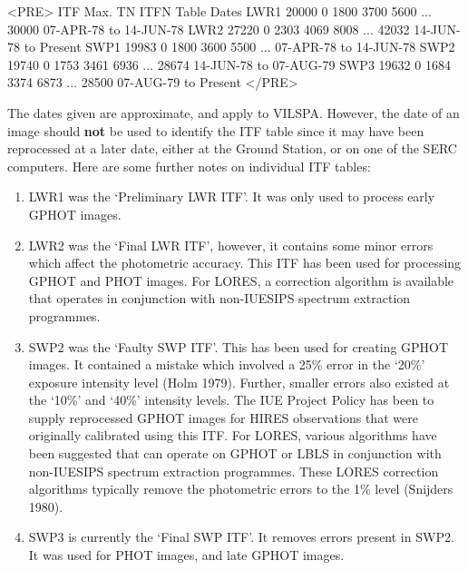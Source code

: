 \begin{htmlonly}
\begin{rawhtml}
<PRE>
ITF   Max. TN  ITFN Table                       Dates
LWR1  20000    0  1800  3700  5600  ... 30000   07-APR-78 to 14-JUN-78
LWR2  27220    0  2303  4069  8008  ... 42032   14-JUN-78 to Present
SWP1  19983    0  1800  3600  5500  ...         07-APR-78 to 14-JUN-78
SWP2  19740    0  1753  3461  6936  ... 28674   14-JUN-78 to 07-AUG-79
SWP3  19632    0  1684  3374  6873  ... 28500   07-AUG-79 to Present
</PRE>
\end{rawhtml}
\end{htmlonly}

The dates given are approximate, and apply to VILSPA\@.  However, the date of
an image should {\bf not} be used to identify the ITF table since it may have
been reprocessed at a later date, either at the Ground Station, or on one of
the SERC computers.  Here are some further notes on individual ITF tables:

\begin{enumerate}

\item LWR1 was the `Preliminary LWR ITF'\@.  It was only used to process early
      GPHOT images.

\item LWR2 was the `Final LWR ITF', however, it contains some minor errors
      which affect the photometric accuracy.
      This ITF has been used for processing GPHOT and PHOT images.
      For LORES, a correction algorithm is available that operates in
      conjunction with non-IUESIPS spectrum extraction programmes.

\item SWP2 was the `Faulty SWP ITF'\@.  This has been used for creating GPHOT
      images.  It contained a mistake which involved a 25\% error in the `20\%'
      exposure intensity level (Holm 1979)\@.  Further, smaller errors
      also existed at the `10\%' and `40\%' intensity levels.  The
      IUE Project Policy has been to supply reprocessed GPHOT images for HIRES
      observations that were originally calibrated using this ITF\@.  For LORES,
      various algorithms have been suggested that can operate on GPHOT or
      LBLS in conjunction with non-IUESIPS spectrum extraction programmes.
      These LORES correction algorithms typically remove the photometric
      errors to the 1\% level (Snijders 1980)\@.

\item SWP3 is currently the `Final SWP ITF'\@.  It removes errors present
      in SWP2.  It was used for PHOT images, and late GPHOT images.

\end{enumerate}


